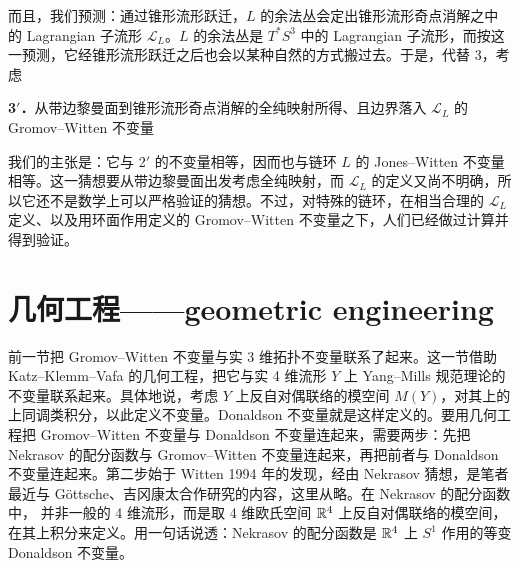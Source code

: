 而且，我们预测：通过锥形流形跃迁，$L$ 的余法丛会定出锥形流形奇点消解之中的 Lagrangian 子流形 $\mathcal{L}_L$。$L$ 的余法丛是 $T^*S^3$ 中的 Lagrangian 子流形，而按这一预测，它经锥形流形跃迁之后也会以某种自然的方式搬过去。于是，代替 3，考虑

\noindent\textbf{3$'$．}\quad 从带边黎曼面到锥形流形奇点消解的全纯映射所得、且边界落入 $\mathcal{L}_L$ 的 Gromov--Witten 不变量

我们的主张是：它与 2$'$ 的不变量相等，因而也与链环 $L$ 的 Jones--Witten 不变量相等。这一猜想要从带边黎曼面出发考虑全纯映射，而 $\mathcal{L}_L$ 的定义又尚不明确，所以它还不是数学上可以严格验证的猜想。不过，对特殊的链环，在相当合理的 $\mathcal{L}_L$ 定义、以及用环面作用定义的 Gromov--Witten 不变量之下，人们已经做过计算并得到验证。

\section{几何工程——geometric engineering}

前一节把 Gromov--Witten 不变量与实 3 维拓扑不变量联系了起来。这一节借助 Katz--Klemm--Vafa 的几何工程，把它与实 4 维流形 $Y$ 上 Yang--Mills 规范理论的不变量联系起来。具体地说，考虑 $Y$ 上反自对偶联络的模空间 $M(Y)$，对其上的上同调类积分，以此定义不变量。Donaldson 不变量就是这样定义的。要用几何工程把 Gromov--Witten 不变量与 Donaldson 不变量连起来，需要两步：先把 Nekrasov 的配分函数与 Gromov--Witten 不变量连起来，再把前者与 Donaldson 不变量连起来。第二步始于 Witten 1994 年的发现，经由 Nekrasov 猜想，是笔者最近与 Göttsche、吉冈康太合作研究的内容，这里从略。在 Nekrasov 的配分函数中，
并非一般的 4 维流形，而是取 4 维欧氏空间 $\mathbb{R}^4$ 上反自对偶联络的模空间，在其上积分来定义。用一句话说透：Nekrasov 的配分函数是 $\mathbb{R}^4$ 上 $S^1$ 作用的等变 Donaldson 不变量。

